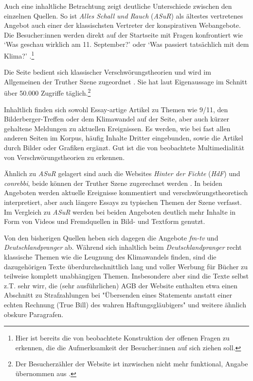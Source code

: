 Auch eine inhaltliche Betrachtung zeigt deutliche Unterschiede zwischen den einzelnen Quellen.
So ist \textit{Alles Schall und Rauch} (\textit{ASuR}) als ältestes vertretenes Angebot auch einer der klassischsten Vertreter der konspirativen Webangebote.
Die Besucher:innen werden direkt auf der Startseite mit Fragen konfrontiert wie \enquote*{Was geschau wirklich am 11. September?} oder \enquote*{Was passiert tatsächlich mit dem Klima?} \parencite{asur-homepage}.\footnote{Hier ist bereits die von \textcite[][205]{filatkina_2018} beobachtete Konstruktion der offenen Fragen zu erkennen, die die Aufmerksamkeit der Besucher:innen auf sich ziehen soll.}

Die Seite bedient sich klassischer Verschwörungstheorien und wird im Allgemeinen der Truther Szene zugeordnet \parencite{psiram-asur}.
Sie hat laut Eigenaussage im Schnitt über 50.000 Zugriffe täglich.\footnote{Der Besucherzähler der Website ist inzwischen nicht mehr funktional, Angabe übernommen aus \textcite{vice-asur}.}

Inhaltlich finden sich sowohl Essay-artige Artikel zu Themen wie 9/11, den Bilderberger-Treffen oder dem Klimawandel auf der Seite, aber auch kürzer gehaltene Meldungen zu aktuellen Ereignissen.
Es werden, wie bei fast allen anderen Seiten im Korpus, häufig Inhalte Dritter eingebunden, sowie die Artikel durch Bilder oder Grafiken ergänzt.
Gut ist die von \textcite{soukup_2008} beobachtete Multimedialität von Verschwörungstheorien zu erkennen.

Ähnlich zu \textit{ASuR} gelagert sind auch die Websites \textit{Hinter der Fichte} (\textit{HdF}) und \textit{conrebbi}, beide können der Truther Szene zugerechnet werden \parencite[vgl.][]{psiram-conrebbi}.
In beiden Angeboten werden aktuelle Ereignisse kommentiert und verschwörungstheoretisch interpretiert, aber auch längere Essays zu typischen Themen der Szene verfasst.
Im Vergleich zu \textit{ASuR} werden bei beiden Angeboten deutlich mehr Inhalte in Form von Videos und Fremdquellen in Bild- und Textform genutzt.

Von den bisherigen Quellen heben sich dagegen die Angebote \textit{fm-tv} und \textit{Deutschlandpranger} ab.
Während sich inhaltlich beim \textit{Deutschlandpranger} recht klassische Themen wie die Leugnung des Klimawandels \parencite*[vgl.][]{dprang-klima} finden, sind die dazugehörigen Texte überdurchschnittlich lang und voller Werbung für Bücher zu teilweise komplett unabhängigen Themen.
Insbesondere aber sind die Texte selbst z.T. sehr wirr, die (sehr ausführlichen) AGB der Website enthalten etwa einen Abschnitt zu Strafzahlungen bei "Übersenden eines Statements anstatt einer echten Rechnung (True Bill) des wahren Haftungsgläubigers" \parencite{dprang-agb} und weitere ähnlich obskure Paragrafen.


